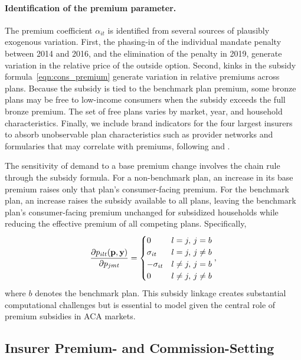 \documentclass[12pt]{article}
\begin{document}
\paragraph{Identification of the premium parameter.} The premium coefficient $\alpha_{it}$ is identified from several sources of plausibly exogenous variation. First, the phasing-in of the individual mandate penalty between 2014 and 2016, and the elimination of the penalty in 2019, generate variation in the relative price of the outside option. Second, kinks in the subsidy formula~\eqref{eqn:cons_premium} generate variation in relative premiums across plans. Because the subsidy is tied to the benchmark plan premium, some bronze plans may be free to low-income consumers when the subsidy exceeds the full bronze premium. The set of free plans varies by market, year, and household characteristics. Finally, we include brand indicators for the four largest insurers to absorb unobservable plan characteristics such as provider networks and formularies that may correlate with premiums, following \citet{ho2014} and \citet{tebaldi2025}.

The sensitivity of demand to a base premium change involves the chain rule through the subsidy formula. For a non-benchmark plan, an increase in its base premium raises only that plan's consumer-facing premium. For the benchmark plan, an increase raises the subsidy available to all plans, leaving the benchmark plan's consumer-facing premium unchanged for subsidized households while reducing the effective premium of all competing plans. Specifically,
\begin{equation}
\label{eqn:price_partial_formula}
    \frac{\partial p_{ilt}({\bf p},{\bf y})}{\partial p_{jmt}} =
    \begin{cases}
	    0 & l=j, \, j = b \\
		\sigma_{it} & l = j, \, j \neq b \\
		-\sigma_{it} & l \neq j, \, j = b \\
		0 & l \neq j, \, j \neq b
    \end{cases},
\end{equation}
where $b$ denotes the benchmark plan. This subsidy linkage creates substantial computational challenges but is essential to model given the central role of premium subsidies in ACA markets.


\subsection{Insurer Premium- and Commission-Setting}
\label{subsec:supply}
\end{document}
